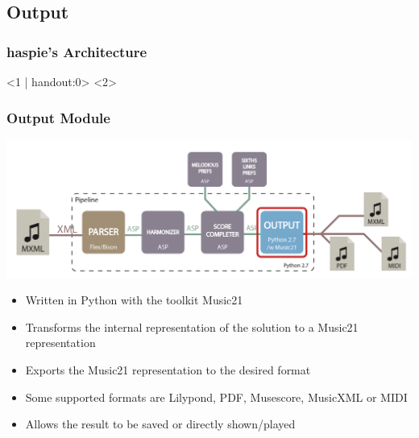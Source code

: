 \documentclass[english,handout]{beamer}
\begin{document}
\subsection{Output}
	\begin{frame}
		\frametitle{haspie's Architecture}
		\begin{center}
		<1 | handout:0>
		<2>
		\end{center}
	\end{frame}
		\begin{frame}[t]
		\frametitle{Output Module}
		\begin{center}
				\includegraphics[width=0.6\linewidth]{imagenes/arch_trans/arquitectura_final_out-01.png}
				\end{center}
			\begin{itemize}
				\item Written in \alert{Python} with the toolkit \alert{Music21}
				\item Transforms the internal representation of the solution to a Music21 representation
				\pause
				\item Exports the Music21 representation to the desired format
				\item Some supported formats are Lilypond, PDF, Musescore, MusicXML or MIDI
				\item Allows the result to be \alert{saved or directly shown/played}
			\end{itemize}
		\end{frame}
\end{document}
